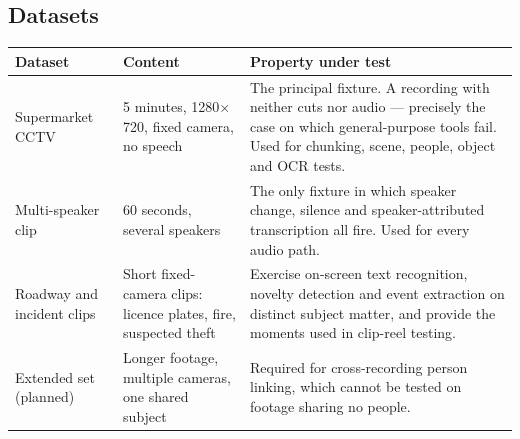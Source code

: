 \subsection{Datasets}

\begin{table}[htbp]
\centering
\small
\begin{tabularx}{\textwidth}{@{}L{3.4cm}L{3.6cm}X@{}}
\toprule
\textbf{Dataset} & \textbf{Content} & \textbf{Property under test} \\
\midrule
Supermarket CCTV & 5 minutes, 1280$\times$720, fixed camera, no speech &
The principal fixture. A recording with neither cuts nor audio --- precisely the case
on which general-purpose tools fail. Used for chunking, scene, people, object and OCR
tests. \\
Multi-speaker clip & 60 seconds, several speakers &
The only fixture in which speaker change, silence and speaker-attributed transcription
all fire. Used for every audio path. \\
Roadway and incident clips & Short fixed-camera clips: licence plates, fire, suspected theft &
Exercise on-screen text recognition, novelty detection and event extraction on
distinct subject matter, and provide the moments used in clip-reel testing. \\
Extended set (planned) & Longer footage, multiple cameras, one shared subject &
Required for cross-recording person linking, which cannot be tested on footage sharing
no people. \\
\bottomrule
\end{tabularx}
\end{table}
